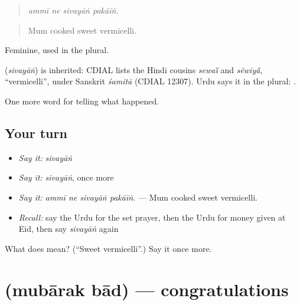 \begin{quote}
   
\end{quote}

\begin{quote}
\emph{ammī ne sivayāṅ pakāīṅ.}
\end{quote}

\begin{quote}
Mum cooked sweet vermicelli.
\end{quote}

Feminine, used in the plural.

\begin{cousinweb}
\textbf{} (\emph{sivayāṅ}) is inherited: CDIAL lists the Hindi cousins \emph{sewaī̃} and \emph{sẽwiyā̃}, \textquotedblleft{}vermicelli\textquotedblright{}, under Sanskrit \emph{śamitā} (CDIAL 12307). Urdu says it in the plural: \textbf{ }.
\end{cousinweb}

\begin{grammarlens}[title={What you've built}]
One more word for telling what happened.
\end{grammarlens}

\subsection*{Your turn}
\begin{itemize}
\raggedright
  \item \emph{Say it:} \emph{sivayāṅ}
  \item \emph{Say it:} \emph{sivayāṅ}, once more
  \item \emph{Say it:} \emph{ammī ne sivayāṅ pakāīṅ.} — Mum cooked sweet vermicelli.
  \item \emph{Recall:} say the Urdu for the set prayer, then the Urdu for money given at Eid, then say \emph{sivayāṅ} again
\end{itemize}

\begin{tcolorbox}[breakable,colback=teal!4,colframe=teal!35!black,title={Before you move on}]
What does  mean? (\textquotedblleft{}Sweet vermicelli\textquotedblright{}.) Say it once more.
\end{tcolorbox}
\section[\texorpdfstring{\ur{مبارک} \ur{باد} (mubārak bād)}{مبارک باد (mubārak bād)}]{  (mubārak bād) — congratulations}

